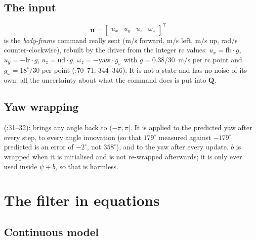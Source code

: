 \subsection{The input}

\begin{equation}
  \mathbf u = \begin{bmatrix} u_x & u_y & u_z & \omega_z \end{bmatrix}^{\!\top}
\end{equation}
is the \emph{body-frame} command really sent (m/s forward, m/s left, m/s up, rad/s counter-clockwise), rebuilt by the driver
from the integer rc values: $u_x = \text{fb}\cdot g$, $u_y = -\text{lr}\cdot g$, $u_z = \text{ud}\cdot g$,
$\omega_z = -\text{yaw}\cdot g_\omega$ with $g = 0.38/30$~m/s per rc point and $g_\omega = 18^\circ/30$ per point
(:70--71, 344--346). It is not a state and has no noise of its own: all the uncertainty about what the
command does is put into $\mathbf Q$.

\subsection{Yaw wrapping}

 (:31--32): brings any angle back to $(-\pi,\pi]$. It is applied to the
predicted yaw after every step, to every angle innovation (so that $179^\circ$ measured against $-179^\circ$ predicted is an
error of $-2^\circ$, not $358^\circ$), and to the yaw after every update. $b$ is wrapped when it is initialised and is
not re-wrapped afterwards; it is only ever used inside $\psi+b$\code{)}, so that is harmless.

\section{The filter in equations}
\label{sec:equations}

\subsection{Continuous model}

